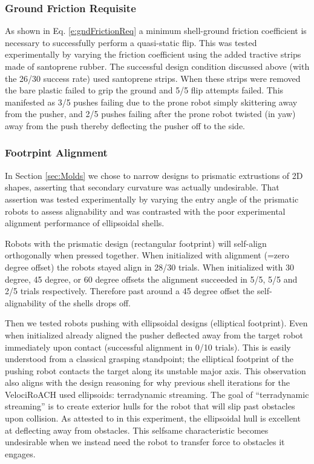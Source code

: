 \documentclass[letterpaper]{report}
\begin{document}
\subsubsection{Ground Friction Requisite}
As shown in Eq. \ref{e:gndFrictionReq} a minimum shell-ground friction coefficient is necessary to successfully perform a quasi-static flip.
This was tested experimentally by varying the friction coefficient using the added tractive strips made of santoprene rubber.
The successful design condition discussed above (with the 26/30 success rate) used santoprene strips.
When these strips were removed the bare plastic failed to grip the ground and 5/5 flip attempts failed.
This manifested as 3/5 pushes failing due to the prone robot simply skittering away from the pusher, and 2/5 pushes failing after the prone robot twisted (in yaw) away from the push thereby deflecting the pusher off to the side.

\subsubsection{Footrpint Alignment}
In Section \ref{sec:Molds} we chose to narrow designs to prismatic extrustions of 2D shapes, asserting that secondary curvature was actually undesirable.
That assertion was tested experimentally by varying the entry angle of the prismatic robots to assess alignability and was contrasted with the poor experimental alignment performance of ellipsoidal shells.

Robots with the prismatic design (rectangular footprint) will self-align orthogonally when pressed together.
When initialized with alignment (=zero degree offset) the robots stayed align in 28/30 trials.
When initialized with 30 degree, 45 degree, or 60 degree offsets the alignment succeeded in 5/5, 5/5 and 2/5 trials respectively.
Therefore past around a 45 degree offset the self-alignability of the shells drops off.

Then we tested robots pushing with ellipsoidal designs (elliptical footprint).
Even when initialized already aligned the pusher deflected away from the target robot immediately upon contact (successful alignment in 0/10 trials).
This is easily understood from a classical grasping standpoint; the elliptical footprint of the pushing robot contacts the target along its unstable major axis.
This observation also aligns with the design reasoning for why previous shell iterations for the VelociRoACH used ellipsoids: terradynamic streaming.
The goal of ``terradynamic streaming'' is to create exterior hulls for the robot that will slip past obstacles upon collision.
As attested to in this experiment, the ellipsoidal hull is excellent at deflecting away from obstacles.
This selfsame characteristic becomes undesirable when we instead need the robot to transfer force to obstacles it engages.
\end{document}
